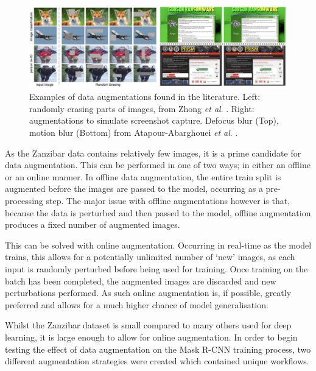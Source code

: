 \begin{figure}[h]
	\begin{center}
		\includegraphics[scale=0.45]{Chapter3/figs/data-augs.png}
	\end{center}
	\caption[Examples of data augmentations found in the literature.]{Examples of data augmentations found in the literature. Left: randomly erasing parts of images, from Zhong \textit{et al}. \cite{zhong_random_2017}. Right: augmentations to simulate screenshot capture. Defocus blur (Top), motion blur (Bottom) from Atapour-Abarghouei \textit{et al}. \cite{atapour-abarghouei_kings_2019}.}
	\label{fig:data-aug-examples}
\end{figure}

As the Zanzibar data contains relatively few images, it is a prime candidate for data augmentation. This can be performed in one of two ways; in either an offline or an online manner. In offline data augmentation, the entire train split is augmented before the images are passed to the model, occurring as a pre-processing step. The major issue with offline augmentations however is that, because the data is perturbed and then passed to the model, offline augmentation produces a fixed number of augmented images. 

This can be solved with online augmentation. Occurring in real-time as the model trains, this allows for a potentially unlimited number of `new' images, as each input is randomly perturbed before being used for training. Once training on the batch has been completed, the augmented images are discarded and new perturbations performed. As such online augmentation is, if possible, greatly preferred and allows for a much higher chance of model generalisation. 

Whilst the Zanzibar dataset is small compared to many others used for deep learning, it is large enough to allow for online augmentation. In order to begin testing the effect of data augmentation on the Mask R-CNN training process, two different augmentation strategies were created which contained unique workflows. 

